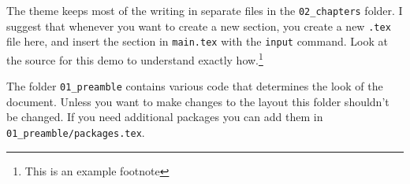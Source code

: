 The theme keeps most of the writing in separate files in the \texttt{02\_chapters} folder. I suggest that whenever you want to create a new section, you create a new \texttt{.tex} file here, and insert the section in \texttt{main.tex} with the \texttt{input} command. Look at the source for this demo to understand exactly how.\footnote{This is an example footnote} 

The folder \texttt{01\_preamble} contains various code that determines the look of the document. Unless you want to make changes to the layout this folder shouldn't be changed. If you need additional packages you can add them in \texttt{01\_preamble/packages.tex}.